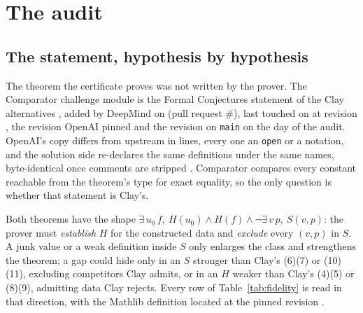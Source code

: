 \documentclass[11pt]{article}
\newcommand{\lean}[1]{\texttt{#1}}
\begin{document}
\section{The audit}\label{sec:audit}

\subsection{The statement, hypothesis by hypothesis}\label{sec:statement}

The theorem the certificate proves was not written by the prover. The Comparator challenge
module is the Formal Conjectures statement of the Clay alternatives \cite{FC}, added by
DeepMind on \FormalConjAdded{} (pull request \#\FormalConjPR), last touched on
\FormalConjTouched{} at revision \lean{\FormalConjRev}, the revision OpenAI pinned and the
revision on \lean{main} on the day of the audit. OpenAI's copy differs from upstream in
\UpstreamDiffLines{} lines, every one an \lean{open} or a notation, and the solution side
re-declares the same definitions under the same names, byte-identical once comments are
stripped \cite{Records}. Comparator compares every constant reachable from the theorem's
type for exact equality, so the only question is whether that statement is Clay's.

Both theorems have the shape $\exists\,u_0\,f,\ H(u_0)\wedge H(f)\wedge\neg\exists\,v\,p,\
S(v,p)$: the prover must \emph{establish} $H$ for the constructed data and \emph{exclude}
every $(v,p)$ in $S$. A junk value or a weak definition inside $S$ only enlarges the class
and strengthens the theorem; a gap could hide only in an $S$ stronger than Clay's (6)(7) or
(10)(11), excluding competitors Clay admits, or in an $H$ weaker than Clay's (4)(5) or
(8)(9), admitting data Clay rejects. Every row of Table~\ref{tab:fidelity} is read in that
direction, with the Mathlib definition located at the pinned revision \cite{Records}.
\end{document}
